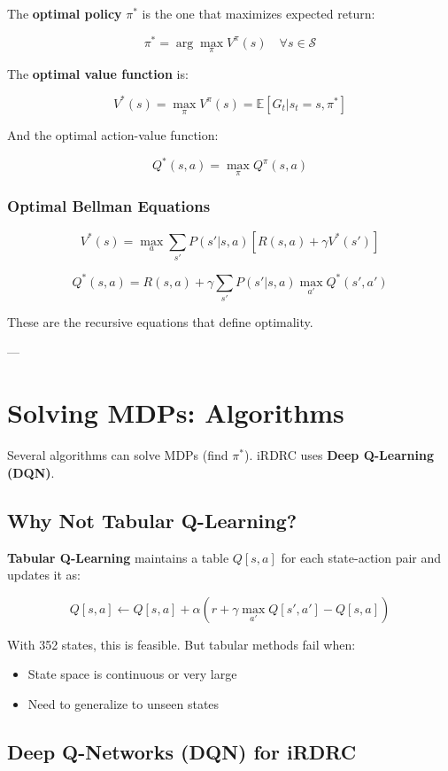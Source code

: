 \documentclass[12pt,a4paper]{article}
\begin{document}
The \textbf{optimal policy} $\pi^*$ is the one that maximizes expected return:

\[
\pi^* = \arg\max_{\pi} V^{\pi}(s) \quad \forall s \in \mathcal{S}
\]

The \textbf{optimal value function} is:

\[
V^*(s) = \max_{\pi} V^{\pi}(s) = \mathbb{E}[G_t | s_t = s, \pi^*]
\]

And the optimal action-value function:

\[
Q^*(s, a) = \max_{\pi} Q^{\pi}(s, a)
\]

\subsubsection{Optimal Bellman Equations}

\[
V^*(s) = \max_a \sum_{s'} P(s'|s,a) \left[ R(s,a) + \gamma V^*(s') \right]
\]

\[
Q^*(s, a) = R(s, a) + \gamma \sum_{s'} P(s'|s,a) \max_{a'} Q^*(s', a')
\]

These are the recursive equations that define optimality.

---

\section{Solving MDPs: Algorithms}

Several algorithms can solve MDPs (find $\pi^*$). iRDRC uses \textbf{Deep Q-Learning (DQN)}.

\subsection{Why Not Tabular Q-Learning?}

\textbf{Tabular Q-Learning} maintains a table $Q[s, a]$ for each state-action pair and updates it as:

\[
Q[s,a] \leftarrow Q[s,a] + \alpha \left( r + \gamma \max_{a'} Q[s', a'] - Q[s,a] \right)
\]

With 352 states, this is feasible. But tabular methods fail when:
\begin{itemize}
    \item State space is continuous or very large
    \item Need to generalize to unseen states
\end{itemize}

\subsection{Deep Q-Networks (DQN) for iRDRC}
\end{document}
